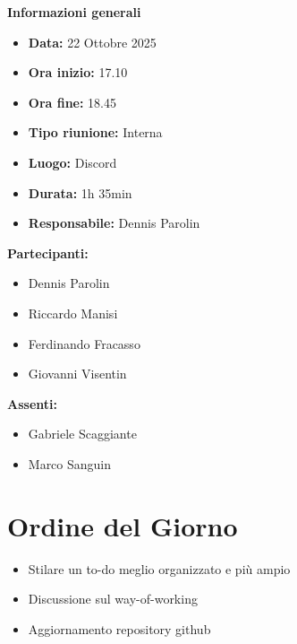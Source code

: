 \documentclass[a4paper,12pt]{article}
\begin{document}
\clearpage
{\large \textbf{Informazioni generali}}
{\footnotesize
{}

\begin{itemize}
    \item \textbf{Data:} 22 Ottobre 2025
    \item \textbf{Ora inizio:} 17.10
    \item \textbf{Ora fine:} 18.45
    \item \textbf{Tipo riunione:} Interna
    \item \textbf{Luogo:} Discord
    \item \textbf{Durata:} 1h 35min
    \item \textbf{Responsabile:} Dennis Parolin
\end{itemize}

\vspace{0.2cm}

\textbf{Partecipanti:}
\begin{itemize}
    \item Dennis Parolin
    \item Riccardo Manisi
    \item Ferdinando Fracasso
    \item Giovanni Visentin
\end{itemize}

\textbf{Assenti:}
\begin{itemize}
    \item Gabriele Scaggiante
    \item Marco Sanguin
\end{itemize}
}

\vspace{0.5cm}

\vspace{0.8cm}

\clearpage
\tableofcontents
\thispagestyle{empty} %
\clearpage

\section{Ordine del Giorno}
\begin{itemize}
    \item Stilare un to-do meglio organizzato e più ampio
    \item Discussione sul way-of-working
    \item Aggiornamento repository github
\end{itemize}
\end{document}
